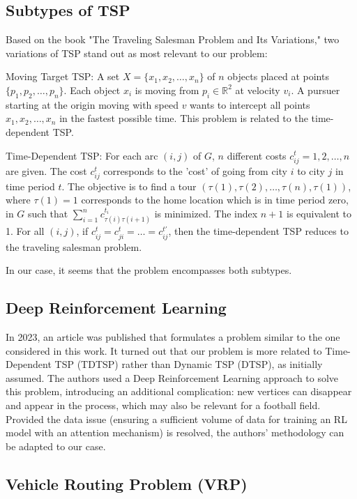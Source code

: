 \subsection{Subtypes of TSP}
Based on the book "The Traveling Salesman Problem and Its Variations," two variations of TSP stand out as most relevant to our problem:

{\color{blue}
Moving Target TSP: A set $X = \{x_1, x_2, \ldots, x_n\}$ of $n$ objects placed at points $\{p_1, p_2, \ldots, p_n\}$. Each object $x_i$ is moving from $p_i \in \mathbb{R}^2$ at velocity $v_i$. A pursuer starting at the origin moving with speed $v$ wants to intercept all points $x_1, x_2, \ldots, x_n$ in the fastest possible time. This problem is related to the time-dependent TSP.

Time-Dependent TSP: For each arc $(i, j)$ of $G$, $n$ different costs $c_{ij}^t = 1, 2, \ldots, n$ are given. The cost $c_{ij}^t$ corresponds to the 'cost' of going from city $i$ to city $j$ in time period $t$. The objective is to find a tour $(\tau(1), \tau(2), \ldots, \tau(n), \tau(1))$, where $\tau(1) = 1$ corresponds to the home location which is in time period zero, in $G$ such that $\sum_{i=1}^{n} c_{\tau(i) \tau(i+1)}^{t_i}$ is minimized. The index $n + 1$ is equivalent to 1. For all $(i, j)$, if $c_{ij}^t = c_{ji}^t = \ldots = c_{ij}^{t'}$, then the time-dependent TSP reduces to the traveling salesman problem.
}

In our case, it seems that the problem encompasses both subtypes.

\subsection{Deep Reinforcement Learning}
In 2023, an article \cite{RL} was published that formulates a problem similar to the one considered in this work. It turned out that our problem is more related to Time-Dependent TSP (TDTSP) rather than Dynamic TSP (DTSP), as initially assumed. 
The authors used a Deep Reinforcement Learning approach to solve this problem, introducing an additional complication: new vertices can disappear and appear in the process, which may also be relevant for a football field. Provided the data issue (ensuring a sufficient volume of data for training an RL model with an attention mechanism) is resolved, the authors' methodology can be adapted to our case.

\subsection{Vehicle Routing Problem (VRP)}

